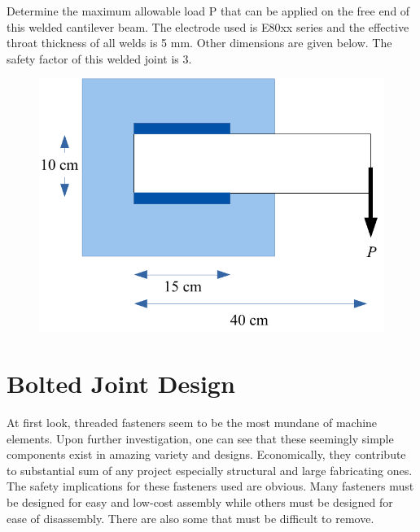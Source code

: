 \documentclass[
10pt,
a4paper,
openany,
svgnames,
]{book}
\newcommand{\exercise}{%
\item \label{lab:\arabic{chapter}.\arabic{exercisesi}}  %
}
\begin{document}
\begin{exercises}
\begin{figure}[H]
  \end{figure}
  \exercise Determine the maximum allowable load P that can be applied on the free end of this welded cantilever beam. The electrode used is E80xx series and the effective throat thickness of all welds is 5 mm. Other dimensions are given below. The safety factor of this welded joint is 3.
  \begin{figure}[H]
    \centering
    \includegraphics[scale=0.72]{pictures/Welding/parallel-weld-exercise}
  \end{figure}
\end{exercises}




\chapter{Bolted Joint Design}

At first look, threaded fasteners seem to be the most mundane of machine elements. Upon further investigation, one can see that these seemingly simple components exist in amazing variety and designs. Economically, they contribute to substantial sum of any project especially structural and large fabricating ones. The safety implications for these fasteners used are obvious. Many fasteners must be designed for easy and low-cost assembly while others must be designed for ease of disassembly. There are also some that must be difficult to remove.
\end{document}
